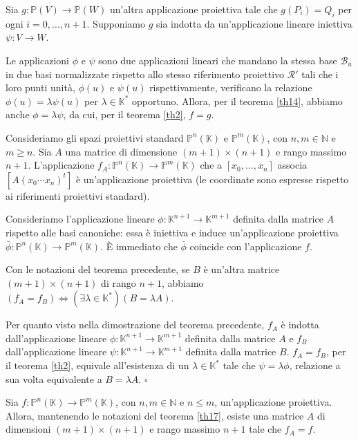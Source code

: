 	\par Sia $g: \mathbb{P}(V) \rightarrow \mathbb{P}(W)$ un'altra applicazione proiettiva tale che $g(P_i) = Q_i$ per ogni $i = 0, ..., n + 1$. Supponiamo $g$ sia indotta da un'applicazione lineare iniettiva $\psi: V \rightarrow W$.
	\par Le applicazioni $\phi$ e $\psi$ sono due applicazioni lineari che mandano la stessa base $\mathcal{B}_u$ in due basi normalizzate rispetto allo stesso riferimento proiettivo $\mathcal{R}'$ tali che i loro punti unit\`a, $\phi(u)$ e $\psi(u)$ rispettivamente, verificano la relazione $\phi(u) = \lambda \psi(u)$ per $\lambda \in \mathbb{K}^*$ opportuno. Allora, per il teorema \ref{th14}, abbiamo anche $\phi = \lambda \psi$, da cui, per il teorema \ref{th2}, $f = g$. \EndProof
\begin{Theorem}\label{th17}
	Consideriamo gli spazi proiettivi standard $\mathbb{P}^n(\mathbb{K})$ e $\mathbb{P}^m(\mathbb{K})$, con $n, m \in \mathbb{N}$ e $m \geq n$. Sia $A$ una matrice di dimensione $(m + 1) \times (n + 1)$ e rango massimo $n + 1$. L'applicazione $f_A: \mathbb{P}^n(\mathbb{K}) \rightarrow \mathbb{P}^m(\mathbb{K})$ che a $[x_0, ..., x_n]$ associa $[A (x_0 \cdots x_n)^t]$ \`e un'applicazione proiettiva (le coordinate sono espresse rispetto ai riferimenti proiettivi standard).
\end{Theorem}
\Proof Consideriamo l'applicazione lineare $\phi: \mathbb{K}^{n + 1} \rightarrow \mathbb{K}^{m + 1}$ definita dalla matrice $A$ rispetto alle basi canoniche: essa \`e iniettiva e induce un'applicazione proiettiva $\bar{\phi}: \mathbb{P}^n(\mathbb{K}) \rightarrow \mathbb{P}^m(\mathbb{K})$. \`E immediato che $\bar{\phi}$ coincide con l'applicazione $f$. \EndProof
\begin{Theorem}\label{th18}
	Con le notazioni del teorema precedente, se $B$ \`e un'altra matrice $(m + 1) \times (n + 1)$ di rango $n + 1$, abbiamo $(f_A = f_B) \Leftrightarrow (\exists \lambda \in \mathbb{K}^*)(B = \lambda A)$.
\end{Theorem}
\Proof Per quanto visto nella dimostrazione del teorema precedente, $f_A$ \`e indotta dall'applicazione lineare $\phi: \mathbb{K}^{n + 1} \rightarrow \mathbb{K}^{m + 1}$ definita dalla matrice $A$ e $f_B$ dall'applicazione lineare $\psi: \mathbb{K}^{n + 1} \rightarrow \mathbb{K}^{m + 1}$ definita dalla matrice $B$. $f_A = f_B$, per il teorema \ref{th2}, equivale all'esistenza di un $\lambda \in \mathbb{K}^*$ tale che $\psi = \lambda \phi$, relazione a sua volta equivalente a $B = \lambda A$. $\square$
\begin{Theorem}\label{th19}
	Sia $f: \mathbb{P}^n(\mathbb{K}) \rightarrow \mathbb{P}^m(\mathbb{K})$, con $n, m \in \mathbb{N}$ e $n \leq m$, un'applicazione proiettiva. Allora, mantenendo le notazioni del teorema \ref{th17}, esiste una matrice $A$ di dimensioni $(m + 1) \times (n + 1)$ e rango massimo $n + 1$ tale che $f_A = f$.
\end{Theorem}
